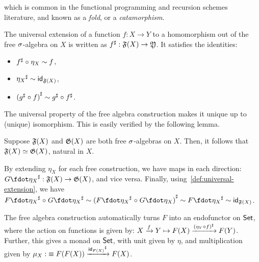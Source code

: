 which is common in the functional programming and recursion schemes literature, and known as a \emph{fold},
or a \emph{catamorphism}.
%
\begin{definition}
    \label{def:universal-extension}
    The universal extension of a function $f : X \to Y$ to a homomorphism out of the free $\sigma$-algebra on $X$ is written
    as ${f}^{\sharp} : \mathfrak{F}(X) \to \mathfrak{Y}$.
    It satisfies the identities:
    \begin{itemize}
        \item ${f}^{\sharp} \mathrel{\circ} \eta_X \mathrel{\sim} f$,
        \item ${\eta_{X}}^{\sharp} \mathrel{\sim} \operatorname{\mathsf{id}}_{\mathfrak{F}(X)}$,
        \item ${({g}^{\sharp} \mathrel{\circ} f)}^{\sharp} \mathrel{\sim} {g}^{\sharp} \mathrel{\circ} {f}^{\sharp}$.
    \end{itemize}
\end{definition}

The universal property of the free algebra construction makes it unique up to (unique) isomorphism.
%
This is easily verified by the following lemma.
\begin{lemma}
    \label{lem:free-algebras-unique}
    Suppose $\mathfrak{F}(X)$ and $\mathfrak{G}(X)$ are both free $\sigma$-algebras on $X$.
    Then, it follows that $\mathfrak{F}(X) \mathrel{\simeq} \mathfrak{G}(X)$, natural in $X$.
\end{lemma}
\begin{proofsketch}
    By extending $\eta_X$ for each free construction,
    we have maps in each direction:
    ${\ext{G\fdot\eta_{X}} : \str{F}(X) \to \str{G}(X)}$, and vice versa.
    Finally, using~\cref{def:universal-extension}, we have
    \(
    {\ext{F\fdot\eta_{X}} \comp \ext{G\fdot\eta_{X}}} \htpy
    {\ext{(\ext{F\fdot\eta_{X}} \comp G\fdot\eta_{X})}} \htpy
    {\ext{F\fdot\eta_{X}}} \htpy
    {\idfunc_{\str{F}(X)}}
    \).
\end{proofsketch}
The free algebra construction automatically turns $F$ into an endofunctor on $\mathsf{Set}$,
where the action on functions is given by:
$X \xrightarrow{f} Y \mapsto F(X) \xrightarrow{{(\eta_{Y} \mathrel{\circ} f)}^{\sharp}} F(Y)$.
%
Further, this gives a monad on $\mathsf{Set}$, with unit given by $\eta$,
and multiplication given by $\mu_{X} \defeq F(F(X)) \xto{\ext{\idfunc_{F(X)}}} F(X)$.

